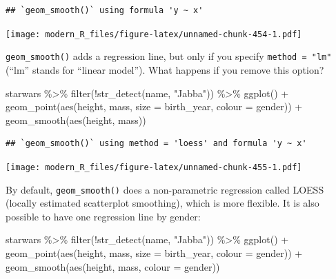 \documentclass[
]{article}
\newenvironment{Shaded}{\begin{snugshade}}{\end{snugshade}}
\newcommand{\AttributeTok}[1]{\textcolor[rgb]{0.77,0.63,0.00}{#1}}
\newcommand{\FunctionTok}[1]{\textcolor[rgb]{0.00,0.00,0.00}{#1}}
\newcommand{\NormalTok}[1]{#1}
\newcommand{\SpecialCharTok}[1]{\textcolor[rgb]{0.00,0.00,0.00}{#1}}
\newcommand{\StringTok}[1]{\textcolor[rgb]{0.31,0.60,0.02}{#1}}
\begin{document}
\begin{verbatim}
## `geom_smooth()` using formula 'y ~ x'
\end{verbatim}

\texttt{[image: modern\_R\_files/figure-latex/unnamed-chunk-454-1.pdf]}

\texttt{geom\_smooth()} adds a regression line, but only if you specify \texttt{method\ =\ "lm"} (``lm'' stands for
``linear model''). What happens if you remove this option?

\begin{Shaded}
\begin{Highlighting}[]
\NormalTok{starwars }\SpecialCharTok{\%\textgreater{}\%}
  \FunctionTok{filter}\NormalTok{(}\SpecialCharTok{!}\FunctionTok{str\_detect}\NormalTok{(name, }\StringTok{"Jabba"}\NormalTok{)) }\SpecialCharTok{\%\textgreater{}\%}
  \FunctionTok{ggplot}\NormalTok{() }\SpecialCharTok{+}
    \FunctionTok{geom\_point}\NormalTok{(}\FunctionTok{aes}\NormalTok{(height, mass, }\AttributeTok{size =}\NormalTok{ birth\_year, }\AttributeTok{colour =}\NormalTok{ gender)) }\SpecialCharTok{+}
    \FunctionTok{geom\_smooth}\NormalTok{(}\FunctionTok{aes}\NormalTok{(height, mass))}
\end{Highlighting}
\end{Shaded}

\begin{verbatim}
## `geom_smooth()` using method = 'loess' and formula 'y ~ x'
\end{verbatim}

\texttt{[image: modern\_R\_files/figure-latex/unnamed-chunk-455-1.pdf]}

By default, \texttt{geom\_smooth()} does a non-parametric regression called LOESS (locally estimated scatterplot smoothing),
which is more flexible. It is also possible to have one regression line by gender:

\begin{Shaded}
\begin{Highlighting}[]
\NormalTok{starwars }\SpecialCharTok{\%\textgreater{}\%}
  \FunctionTok{filter}\NormalTok{(}\SpecialCharTok{!}\FunctionTok{str\_detect}\NormalTok{(name, }\StringTok{"Jabba"}\NormalTok{)) }\SpecialCharTok{\%\textgreater{}\%}
  \FunctionTok{ggplot}\NormalTok{() }\SpecialCharTok{+}
    \FunctionTok{geom\_point}\NormalTok{(}\FunctionTok{aes}\NormalTok{(height, mass, }\AttributeTok{size =}\NormalTok{ birth\_year, }\AttributeTok{colour =}\NormalTok{ gender)) }\SpecialCharTok{+}
    \FunctionTok{geom\_smooth}\NormalTok{(}\FunctionTok{aes}\NormalTok{(height, mass, }\AttributeTok{colour =}\NormalTok{ gender))}
\end{Highlighting}
\end{Shaded}
\end{document}
